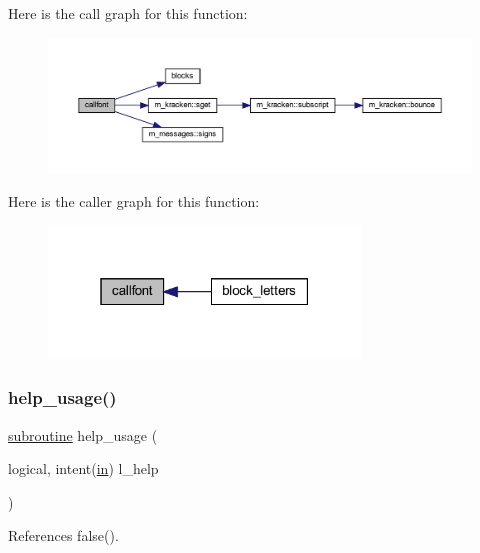 Here is the call graph for this function\+:
\nopagebreak
\begin{figure}[H]
\begin{center}
\leavevmode
\includegraphics[width=350pt]{note_8f90_a05dfb57174f958e4973af20d00512f49_cgraph}
\end{center}
\end{figure}
Here is the caller graph for this function\+:
\nopagebreak
\begin{figure}[H]
\begin{center}
\leavevmode
\includegraphics[width=235pt]{note_8f90_a05dfb57174f958e4973af20d00512f49_icgraph}
\end{center}
\end{figure}
\mbox{\label{note_8f90_a3e09a3b52ee8fb04eeb93fe5761626a8}} 
\subsubsection{\texorpdfstring{help\+\_\+usage()}{help\_usage()}}
{\footnotesize\ttfamily \hyperlink{M__stopwatch_83_8txt_acfbcff50169d691ff02d4a123ed70482}{subroutine} help\+\_\+usage (\begin{DoxyParamCaption}\item[{logical, intent(\hyperlink{M__journal_83_8txt_afce72651d1eed785a2132bee863b2f38}{in})}]{l\+\_\+help }\end{DoxyParamCaption})}



References false().

